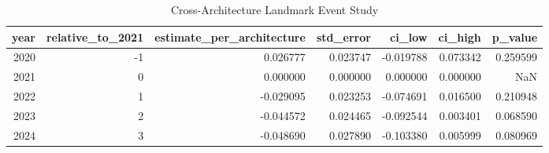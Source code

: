 \begin{table}
\caption{Cross-Architecture Landmark Event Study}
\label{tab:table1_event_study_gate}
\begin{tabular}{rrrrrrr}
\toprule
year & relative_to_2021 & estimate_per_architecture & std_error & ci_low & ci_high & p_value \\
\midrule
2020 & -1 & 0.026777 & 0.023747 & -0.019788 & 0.073342 & 0.259599 \\
2021 & 0 & 0.000000 & 0.000000 & 0.000000 & 0.000000 & NaN \\
2022 & 1 & -0.029095 & 0.023253 & -0.074691 & 0.016500 & 0.210948 \\
2023 & 2 & -0.044572 & 0.024465 & -0.092544 & 0.003401 & 0.068590 \\
2024 & 3 & -0.048690 & 0.027890 & -0.103380 & 0.005999 & 0.080969 \\
\bottomrule
\end{tabular}
\end{table}

